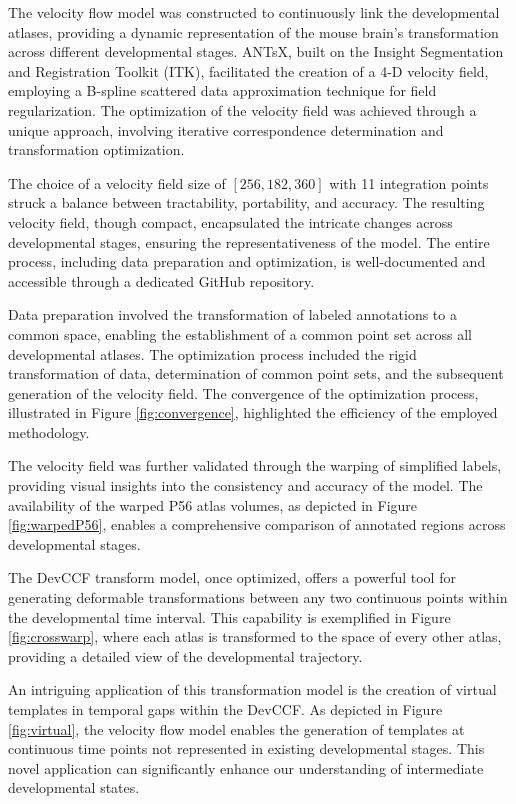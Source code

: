 \documentclass[
  12pt,
]{article}
\begin{document}
The velocity flow model was constructed to continuously link the
developmental atlases, providing a dynamic representation of the mouse
brain's transformation across different developmental stages. ANTsX,
built on the Insight Segmentation and Registration Toolkit (ITK),
facilitated the creation of a 4-D velocity field, employing a B-spline
scattered data approximation technique for field regularization. The
optimization of the velocity field was achieved through a unique
approach, involving iterative correspondence determination and
transformation optimization.

The choice of a velocity field size of \([256, 182, 360]\) with 11
integration points struck a balance between tractability, portability,
and accuracy. The resulting velocity field, though compact, encapsulated
the intricate changes across developmental stages, ensuring the
representativeness of the model. The entire process, including data
preparation and optimization, is well-documented and accessible through
a dedicated GitHub repository.

Data preparation involved the transformation of labeled annotations to a
common space, enabling the establishment of a common point set across
all developmental atlases. The optimization process included the rigid
transformation of data, determination of common point sets, and the
subsequent generation of the velocity field. The convergence of the
optimization process, illustrated in Figure \ref{fig:convergence},
highlighted the efficiency of the employed methodology.

The velocity field was further validated through the warping of
simplified labels, providing visual insights into the consistency and
accuracy of the model. The availability of the warped P56 atlas volumes,
as depicted in Figure \ref{fig:warpedP56}, enables a comprehensive
comparison of annotated regions across developmental stages.

The DevCCF transform model, once optimized, offers a powerful tool for
generating deformable transformations between any two continuous points
within the developmental time interval. This capability is exemplified
in Figure \ref{fig:crosswarp}, where each atlas is transformed to the
space of every other atlas, providing a detailed view of the
developmental trajectory.

An intriguing application of this transformation model is the creation
of virtual templates in temporal gaps within the DevCCF. As depicted in
Figure \ref{fig:virtual}, the velocity flow model enables the generation
of templates at continuous time points not represented in existing
developmental stages. This novel application can significantly enhance
our understanding of intermediate developmental states.
\end{document}
